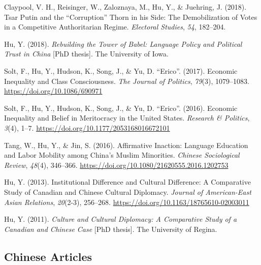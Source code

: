 \documentclass[11pt,a4paper,]{awesome-cv}
\begin{document}
\leavevmode{}%
Claypool, V. H., Reisinger, W., Zaloznaya, M., Hu, Y., \& Juehring, J.
(2018). Tsar Putin and the {``Corruption''} Thorn in his Side: The
Demobilization of Votes in a Competitive Authoritarian Regime.
\emph{Electoral Studies}, \emph{54}, 182--204.

\leavevmode{}%
Hu, Y. (2018). \emph{Rebuilding the Tower of Babel: Language Policy and
Political Trust in China} {[}PhD thesis{]}. The University of Iowa.

\leavevmode{}%
Solt, F., Hu, Y., Hudson, K., Song, J., \& Yu, D. ``Erico''. (2017).
Economic Inequality and Class Consciousness. \emph{The Journal of
Politics}, \emph{79}(3), 1079--1083.
\url{https://doi.org/10.1086/690971}

\leavevmode{}%
Solt, F., Hu, Y., Hudson, K., Song, J., \& Yu, D. ``Erico''. (2016).
Economic Inequality and Belief in Meritocracy in the United States.
\emph{Research \& Politics}, \emph{3}(4), 1--7.
\url{https://doi.org/10.1177/2053168016672101}

\leavevmode{}%
Tang, W., Hu, Y., \& Jin, S. (2016). Affirmative Inaction: Language
Education and Labor Mobility among China's Muslim Minorities.
\emph{Chinese Sociological Review}, \emph{48}(4), 346--366.
\url{https://doi.org/10.1080/21620555.2016.1202753}

\leavevmode{}%
Hu, Y. (2013). Institutional Difference and Cultural Difference: A
Comparative Study of Canadian and Chinese Cultural Diplomacy.
\emph{Journal of American-East Asian Relations}, \emph{20}(2-3),
256--268. \url{https://doi.org/10.1163/18765610-02003011}

\leavevmode{}%
Hu, Y. (2011). \emph{Culture and Cultural Diplomacy: A Comparative Study
of a Canadian and Chinese Case} {[}PhD thesis{]}. The University of
Regina.

\endgroup

\hypertarget{chinese-articles}{%
\subsection{Chinese Articles}\label{chinese-articles}}

\begingroup
\setlength{\parindent}{-0.5in}
\setlength{\leftskip}{0.5in}
\end{document}

